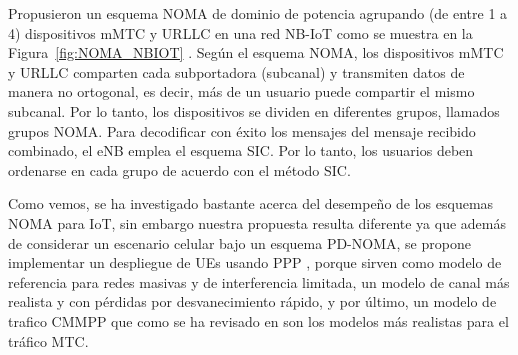 Propusieron un esquema NOMA de dominio de potencia agrupando (de entre 1 a 4) dispositivos mMTC y URLLC en una red NB-IoT como se muestra en la Figura~\ref{fig:NOMA_NBIOT} . Según el esquema NOMA, los dispositivos mMTC y URLLC comparten cada subportadora (subcanal) y transmiten datos de manera no ortogonal, es decir, más de un usuario puede compartir el mismo subcanal. Por lo tanto, los dispositivos se dividen en diferentes grupos, llamados grupos NOMA. Para decodificar con éxito los mensajes del mensaje recibido combinado, el eNB emplea el esquema SIC. Por lo tanto, los usuarios deben ordenarse en cada grupo de acuerdo con el método SIC.\newline

Como vemos, se ha investigado bastante acerca del desempeño de los esquemas NOMA para IoT, sin embargo nuestra propuesta resulta diferente ya que además de considerar un escenario celular bajo un esquema PD-NOMA, se propone implementar un despliegue de UEs usando PPP , porque sirven como modelo de referencia para redes masivas y de interferencia limitada, un modelo de canal más realista y con pérdidas por desvanecimiento rápido, y por último, un modelo de trafico CMMPP que como se ha revisado en \parencite{Gupta2018} son los modelos más realistas para el tráfico MTC.
